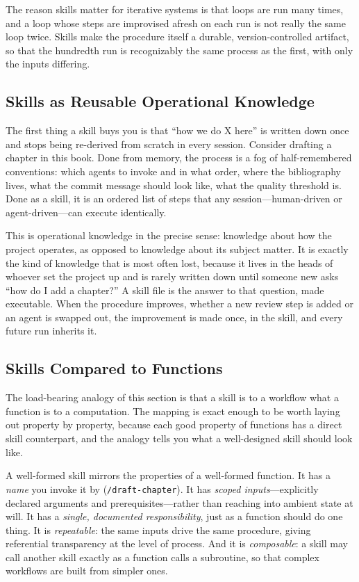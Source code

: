 The reason skills matter for iterative systems is that loops are run many times, and a loop whose steps are improvised afresh on each run is not really the same loop twice. Skills make the procedure itself a durable, version-controlled artifact, so that the hundredth run is recognizably the same process as the first, with only the inputs differing.

\subsection{Skills as Reusable Operational Knowledge}\label{subsec:skills-operational-knowledge}

The first thing a skill buys you is that ``how we do X here'' is written down once and stops being re-derived from scratch in every session. Consider drafting a chapter in this book. Done from memory, the process is a fog of half-remembered conventions: which agents to invoke and in what order, where the bibliography lives, what the commit message should look like, what the quality threshold is. Done as a skill, it is an ordered list of steps that any session---human-driven or agent-driven---can execute identically.

This is operational knowledge in the precise sense: knowledge about how the project operates, as opposed to knowledge about its subject matter. It is exactly the kind of knowledge that is most often lost, because it lives in the heads of whoever set the project up and is rarely written down until someone new asks ``how do I add a chapter?'' A skill file is the answer to that question, made executable. When the procedure improves, whether a new review step is added or an agent is swapped out, the improvement is made once, in the skill, and every future run inherits it.

\subsection{Skills Compared to Functions}\label{subsec:skills-as-functions}

The load-bearing analogy of this section is that a skill is to a workflow what a function is to a computation. The mapping is exact enough to be worth laying out property by property, because each good property of functions has a direct skill counterpart, and the analogy tells you what a well-designed skill should look like.

\begin{definition}\label{def:skill-function}
A well-formed skill mirrors the properties of a well-formed function. It has a \emph{name} you invoke it by (\texttt{/draft-chapter}). It has \emph{scoped inputs}---explicitly declared arguments and prerequisites---rather than reaching into ambient state at will. It has a \emph{single, documented responsibility}, just as a function should do one thing. It is \emph{repeatable}: the same inputs drive the same procedure, giving referential transparency at the level of process. And it is \emph{composable}: a skill may call another skill exactly as a function calls a subroutine, so that complex workflows are built from simpler ones.
\end{definition}

